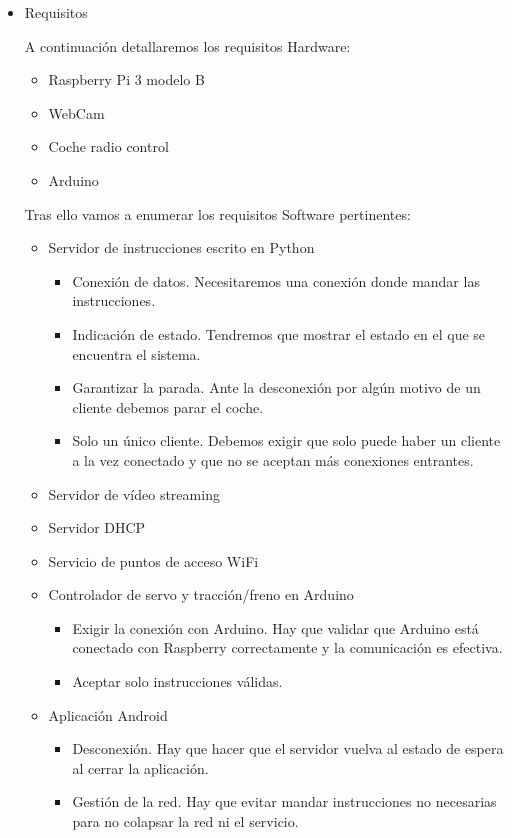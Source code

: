 \documentclass{pclass}
\begin{document}
\begin{itemize}
	\item Requisitos
	
	A continuación detallaremos los requisitos Hardware:

	\begin{itemize}
		\item Raspberry Pi 3 modelo B
		\item WebCam
		\item Coche radio control
		\item Arduino
	\end{itemize}

	Tras ello vamos a enumerar los requisitos Software pertinentes:
	\begin{itemize}
		\item Servidor de instrucciones escrito en Python
			\begin{itemize}
				\item Conexión de datos. Necesitaremos una conexión donde mandar las instrucciones.
				\item Indicación de estado. Tendremos que mostrar el estado en el que se encuentra el sistema.
				\item Garantizar la parada. Ante la desconexión por algún motivo de un cliente debemos parar el coche.
				\item Solo un único cliente. Debemos exigir que solo puede haber un cliente a la vez conectado y que no se aceptan más conexiones entrantes.
			\end{itemize}
		\item Servidor de vídeo streaming
		\item Servidor DHCP
		\item Servicio de puntos de acceso WiFi
		\item Controlador de servo y tracción/freno en Arduino
			\begin{itemize}
				\item Exigir la conexión con Arduino. Hay que validar que Arduino está conectado con Raspberry correctamente y la comunicación es efectiva.
				\item Aceptar solo instrucciones válidas.
			\end{itemize}
		\item Aplicación Android
			\begin{itemize}
				\item Desconexión. Hay que hacer que el servidor vuelva al estado de espera al cerrar la aplicación.
				\item Gestión de la red. Hay que evitar mandar instrucciones no necesarias para no colapsar la red ni el servicio.
			\end{itemize}
	\end{itemize}


\end{itemize}
\end{document}
